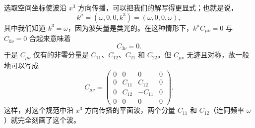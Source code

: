 选取空间坐标使波沿 $x^3$ 方向传播，可以把我们的解写得更显式；也就是说，
\begin{equation*}
k^\mu = (\omega, 0, 0, k^3) = (\omega, 0, 0, \omega),
\tag{7.100}
\end{equation*}
其中我们知道 $k^3 = \omega$，因为波矢量是类光的。在这种情形下，$k^\mu C_{\mu\nu} = 0$ 与 $C_{0\nu} = 0$ 合起来意味着
\begin{equation*}
C_{3\nu} = 0.
\tag{7.101}
\end{equation*}
于是 $C_{\mu\nu}$ 仅有的非零分量是 $C_{11}$、$C_{12}$、$C_{21}$ 和 $C_{22}$。但 $C_{\mu\nu}$ 无迹且对称，故一般地可以写成
\begin{equation*}
C_{\mu\nu} =
\begin{pmatrix}
0 & 0 & 0 & 0 \\
0 & C_{11} & C_{12} & 0 \\
0 & C_{12} & -C_{11} & 0 \\
0 & 0 & 0 & 0
\end{pmatrix}.
\tag{7.102}
\end{equation*}
这样，对这个规范中沿 $x^3$ 方向传播的平面波，两个分量 $C_{11}$ 和 $C_{12}$（连同频率 $\omega$）就完全刻画了这个波。


